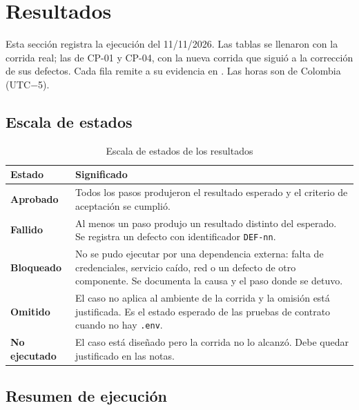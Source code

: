 \section{Resultados}
\label{sec:resultados}

Esta sección registra la ejecución del 11/11/2026. Las tablas se llenaron con la corrida real; las de CP-01 y CP-04, con la nueva corrida que siguió a la corrección de sus defectos. Cada fila remite a su evidencia en . Las horas son de Colombia (UTC$-$5).

\subsection{Escala de estados}

\begin{table}[H]
  \centering
  \small
  \renewcommand{\arraystretch}{1.2}
  \begin{tabularx}{\textwidth}{|>{\raggedright\arraybackslash}p{2.6cm}|>{\raggedright\arraybackslash}X|}
    \hline
    \textbf{Estado} & \textbf{Significado} \\ \hline
    \textbf{Aprobado} & Todos los pasos produjeron el resultado esperado y el criterio de aceptación se cumplió. \\ \hline
    \textbf{Fallido} & Al menos un paso produjo un resultado distinto del esperado. Se registra un defecto con identificador \texttt{DEF-nn}. \\ \hline
    \textbf{Bloqueado} & No se pudo ejecutar por una dependencia externa: falta de credenciales, servicio caído, red o un defecto de otro componente. Se documenta la causa y el paso donde se detuvo. \\ \hline
    \textbf{Omitido} & El caso no aplica al ambiente de la corrida y la omisión está justificada. Es el estado esperado de las pruebas de contrato cuando no hay \texttt{.env}. \\ \hline
    \textbf{No ejecutado} & El caso está diseñado pero la corrida no lo alcanzó. Debe quedar justificado en las notas. \\ \hline
  \end{tabularx}
  \caption{Escala de estados de los resultados}
  \label{tab:escala-estados}
\end{table}

\subsection{Resumen de ejecución}


